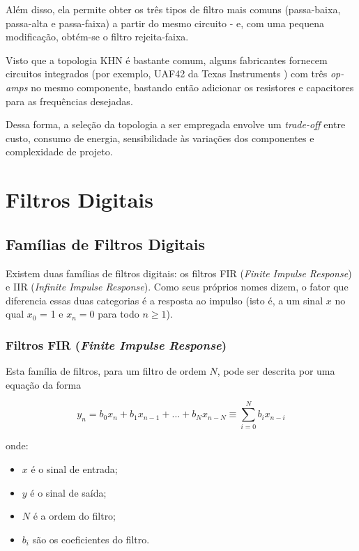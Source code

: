 Além disso, ela permite obter os três tipos de filtro mais comuns (passa-baixa, passa-alta e passa-faixa) a partir do mesmo circuito - e, com uma pequena modificação, obtém-se o filtro rejeita-faixa. 

Visto que a topologia KHN é bastante comum, alguns fabricantes fornecem circuitos integrados (por exemplo, UAF42 da Texas Instruments \cite{uaf42}) com três \textit{op-amps} no mesmo componente, bastando então adicionar os resistores e capacitores para as frequências desejadas.

Dessa forma, a seleção da topologia a ser empregada envolve um \textit{trade-off} entre custo, consumo de energia, sensibilidade às variações dos componentes e complexidade de projeto.

\section{Filtros Digitais}

\subsection{Famílias de Filtros Digitais}
Existem duas famílias de filtros digitais: os filtros FIR (\textit{Finite Impulse Response}) e IIR (\textit{Infinite Impulse Response}). Como seus próprios nomes dizem, o fator que diferencia essas duas categorias é a resposta ao impulso (isto é, a um sinal $x$ no qual $x_0$ = 1 e $x_n = 0$ para todo $n \geq 1$).

\subsubsection{Filtros FIR (\textit{Finite Impulse Response})}

Esta família de filtros, para um filtro de ordem $N$, pode ser descrita por uma equação da forma

\begin{equation}
y_n = b_0 x_n + b_1 x_{n-1} + \dots + b_N x_{n-N} \equiv \sum_{i=0}^{N} b_i x_{n-i}
\label{eq:fir_sum}
\end{equation}

onde:

\begin{itemize}
\item $x$ é o sinal de entrada;
\item $y$ é o sinal de saída;
\item $N$ é a ordem do filtro;
\item $b_i$ são os coeficientes do filtro.
\end{itemize}

